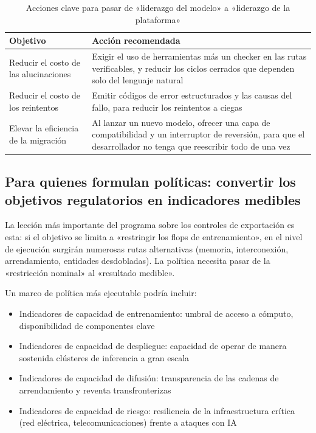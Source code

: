\documentclass[a4paper]{article}
\begin{document}
\begin{table}[H]
\centering
\begin{tabular}{lp{8.5cm}}
\toprule
\textbf{Objetivo} & \textbf{Acción recomendada} \\
\midrule
Reducir el costo de las alucinaciones & Exigir el uso de herramientas más un checker en las rutas verificables, y reducir los ciclos cerrados que dependen solo del lenguaje natural \\
Reducir el costo de los reintentos & Emitir códigos de error estructurados y las causas del fallo, para reducir los reintentos a ciegas \\
Elevar la eficiencia de la migración & Al lanzar un nuevo modelo, ofrecer una capa de compatibilidad y un interruptor de reversión, para que el desarrollador no tenga que reescribir todo de una vez \\
\bottomrule
\end{tabular}
\caption{Acciones clave para pasar de «liderazgo del modelo» a «liderazgo de la plataforma»}
\end{table}

\subsection{Para quienes formulan políticas: convertir los objetivos regulatorios en indicadores medibles}

La lección más importante del programa sobre los controles de exportación es esta: si el objetivo se limita a «restringir los flops de entrenamiento», en el nivel de ejecución surgirán numerosas rutas alternativas (memoria, interconexión, arrendamiento, entidades desdobladas). La política necesita pasar de la «restricción nominal» al «resultado medible».

Un marco de política más ejecutable podría incluir:
\begin{itemize}
    \item Indicadores de capacidad de entrenamiento: umbral de acceso a cómputo, disponibilidad de componentes clave
    \item Indicadores de capacidad de despliegue: capacidad de operar de manera sostenida clústeres de inferencia a gran escala
    \item Indicadores de capacidad de difusión: transparencia de las cadenas de arrendamiento y reventa transfronterizas
    \item Indicadores de capacidad de riesgo: resiliencia de la infraestructura crítica (red eléctrica, telecomunicaciones) frente a ataques con IA
\end{itemize}
\end{document}
